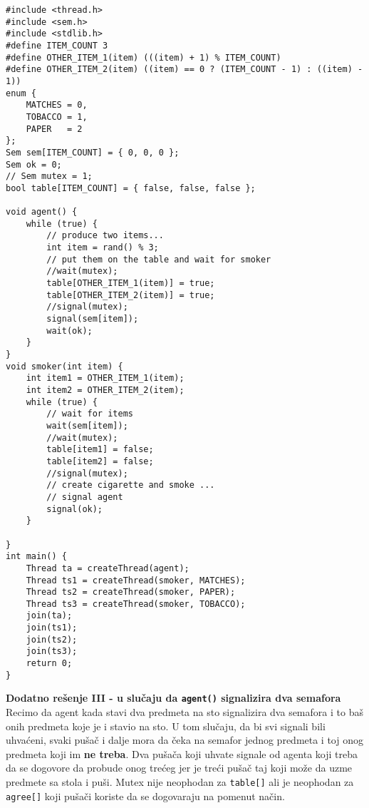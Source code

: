 \begin{lstlisting}
#include <thread.h>
#include <sem.h>
#include <stdlib.h>
#define ITEM_COUNT 3
#define OTHER_ITEM_1(item) (((item) + 1) % ITEM_COUNT)
#define OTHER_ITEM_2(item) ((item) == 0 ? (ITEM_COUNT - 1) : ((item) - 1))
enum {
    MATCHES = 0,
    TOBACCO = 1,
    PAPER   = 2
};
Sem sem[ITEM_COUNT] = { 0, 0, 0 };
Sem ok = 0;
// Sem mutex = 1;
bool table[ITEM_COUNT] = { false, false, false };

void agent() {
    while (true) {
        // produce two items...
        int item = rand() % 3;
        // put them on the table and wait for smoker
        //wait(mutex);
        table[OTHER_ITEM_1(item)] = true;
        table[OTHER_ITEM_2(item)] = true;
        //signal(mutex);
        signal(sem[item]);
        wait(ok);
    }
}
void smoker(int item) {
    int item1 = OTHER_ITEM_1(item);
    int item2 = OTHER_ITEM_2(item);
    while (true) {
		// wait for items
		wait(sem[item]);
        //wait(mutex);
		table[item1] = false;
		table[item2] = false;
        //signal(mutex);
        // create cigarette and smoke ...
		// signal agent
        signal(ok); 
    }
    
}
int main() {
    Thread ta = createThread(agent);
    Thread ts1 = createThread(smoker, MATCHES);
    Thread ts2 = createThread(smoker, PAPER);
    Thread ts3 = createThread(smoker, TOBACCO);
    join(ta);
    join(ts1);
    join(ts2);
    join(ts3);
    return 0;
}

\end{lstlisting}
\newpage
\textbf{\large Dodatno re\v{s}enje III - u slu\v{c}aju da \texttt{agent()} signalizira dva semafora}\\
Recimo da agent kada stavi dva predmeta na sto signalizira dva semafora i to ba\v{s} onih predmeta koje je i stavio na sto. U tom slu\v{c}aju, da bi svi signali bili uhva\'{c}eni, svaki pu\v{s}a\v{c} i dalje mora da \v{c}eka na semafor jednog predmeta i toj onog predmeta koji im \textbf{ne treba}. Dva pu\v{s}a\v{c}a koji uhvate signale od agenta koji treba da se dogovore da probude onog tre\'{c}eg jer je tre\'{c}i pu\v{s}a\v{c} taj koji mo\v{z}e da uzme predmete sa stola i pu\v{s}i. Mutex nije neophodan za \texttt{table[]} ali je neophodan za \texttt{agree[]} koji pu\v{s}a\v{c}i koriste da se dogovaraju na pomenut na\v{c}in.
